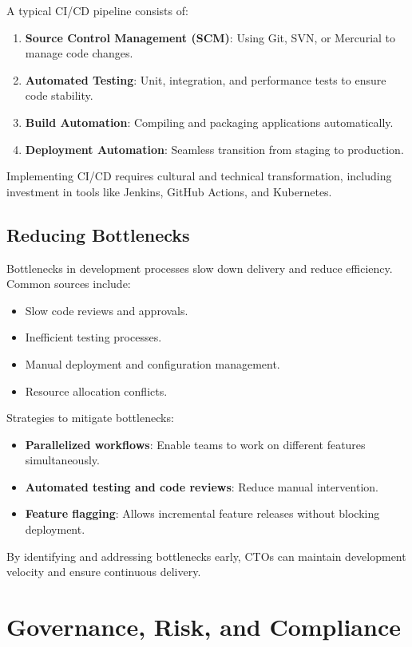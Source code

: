 A typical CI/CD pipeline consists of:
\begin{enumerate}
    \item \textbf{Source Control Management (SCM)}: Using Git, SVN, or Mercurial to manage code changes.
    \item \textbf{Automated Testing}: Unit, integration, and performance tests to ensure code stability.
    \item \textbf{Build Automation}: Compiling and packaging applications automatically.
    \item \textbf{Deployment Automation}: Seamless transition from staging to production.
\end{enumerate}

Implementing CI/CD requires cultural and technical transformation, including investment in tools like Jenkins, GitHub Actions, and Kubernetes.

\subsection{Reducing Bottlenecks}
Bottlenecks in development processes slow down delivery and reduce efficiency. Common sources include:

\begin{itemize}
    \item Slow code reviews and approvals.
    \item Inefficient testing processes.
    \item Manual deployment and configuration management.
    \item Resource allocation conflicts.
\end{itemize}

Strategies to mitigate bottlenecks:
\begin{itemize}
    \item \textbf{Parallelized workflows}: Enable teams to work on different features simultaneously.
    \item \textbf{Automated testing and code reviews}: Reduce manual intervention.
    \item \textbf{Feature flagging}: Allows incremental feature releases without blocking deployment.
\end{itemize}

By identifying and addressing bottlenecks early, CTOs can maintain development velocity and ensure continuous delivery.



\section{Governance, Risk, and Compliance}

